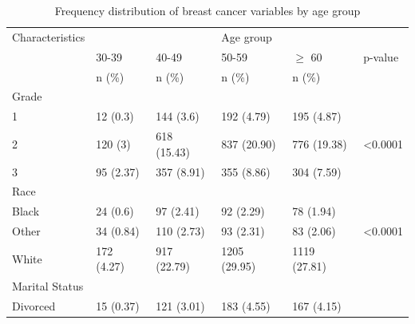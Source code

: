 \documentclass[times,sort&compress,3p]{elsarticle}
\theoremstyle{plain}
\theoremstyle{definition}
\begin{document}
\begin{table}[H]
\centering 
\caption{Frequency distribution of breast cancer variables by age group}
\label{table3}
\begin{tabular}{llllll} \hline \hline

Characteristics  &                                                              &              & Age group    &              &                    \\
                 & 30-39                                                        & 40-49        & 50-59        & $\geq$ 60       & p-value            \\ 
                 & n (\%)                                                       & n (\%)       & n (\%)       & n (\%)       &                    \\ \hline 
Grade            &                                                              &              &              &              &                    \\
1                & 12 (0.3)                                                     & 144 (3.6)    & 192 (4.79)   & 195 (4.87)   &                    \\
2                & 120 (3)                                                      & 618 (15.43)  & 837 (20.90)  & 776 (19.38)  & \textless   0.0001 \\
3                & 95 (2.37)                                                    & 357 (8.91)   & 355 (8.86)   & 304 (7.59)   &                    \\ \hline
Race             &                                                              &              &              &              &                    \\
Black            & 24 (0.6)                                                     & 97 (2.41)    & 92 (2.29)    & 78 (1.94)    &                    \\
Other            & 34 (0.84)                                                    & 110 (2.73)   & 93 (2.31)    & 83 (2.06)    & \textless   0.0001 \\
White            & 172 (4.27)                                                   & 917 (22.79)  & 1205 (29.95) & 1119 (27.81) &                    \\ \hline
Marital Status   &                                                              &              &              &              &                    \\
Divorced         & 15 (0.37)                                                    & 121 (3.01)   & 183 (4.55)   & 167 (4.15)   &                    \\

\end{tabular}
\end{table}
\end{document}
